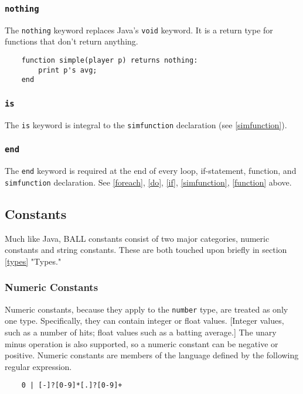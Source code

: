\subsubsection{\texttt{nothing}}\label{nothing}
The \texttt{nothing} keyword replaces Java's \texttt{void} keyword. It is a return type for functions that don't return anything.
\begin{verbatim}
    function simple(player p) returns nothing:
        print p's avg;
    end
\end{verbatim}

\subsubsection{\texttt{is}}\label{is}
The \texttt{is} keyword is integral to the \texttt{simfunction} declaration (see \ref{simfunction}). 

\subsubsection{\texttt{end}}\label{end}
The \texttt{end} keyword is required at the end of every loop, if-statement, function, and \texttt{simfunction} declaration. See \ref{foreach}, \ref{do}, \ref{if}, \ref{simfunction}, \ref{function} above.

\subsection{Constants}
Much like Java, BALL constants consist of two major categories, numeric constants and string constants. These are both touched upon briefly in section \ref{types} "Types."
\subsubsection{Numeric Constants}
Numeric constants, because they apply to the \texttt{number} type, are treated as only one type. Specifically, they can contain integer or float values. [Integer values, such as a number of hits; float values such as a batting average.] The unary minus operation is also supported, so a numeric constant can be negative or positive. Numeric constants are members of the language defined by the following regular expression. 
\begin{verbatim}
    0 | [-]?[0-9]*[.]?[0-9]+
\end{verbatim}

